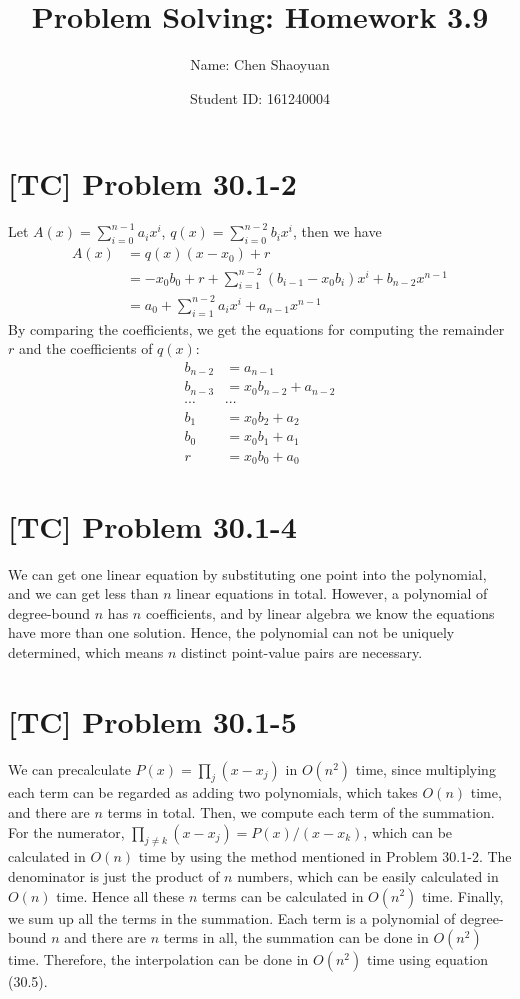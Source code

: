 \documentclass[a4paper,11pt,twocolumn]{article}
\newcommand{\homeworkno}{3.9}
\begin{document}
  \title{Problem Solving: Homework \homeworkno}
  \author{Name: Chen Shaoyuan \and Student ID: 161240004}
  \maketitle

  \section{[TC] Problem 30.1-2}
  Let $A(x) = \sum_{i=0}^{n-1} a_ix^i$, $q(x) = \sum_{i=0}^{n-2} b_ix^i$, then we have
  \begin{align*}
    A(x) &= q(x)(x - x_0) + r \\
         &= -x_0b_{0} + r + \sum_{i = 1}^{n-2}(b_{i-1}-x_0b_{i})x^i + b_{n-2}x^{n-1} \\
         &= a_0 + \sum_{i = 1}^{n-2}a_ix^i + a_{n-1}x^{n-1}
  \end{align*}
  By comparing the coefficients, we get the equations for computing the remainder $r$ and the coefficients of $q(x)$:
  \begin{align*}
    b_{n-2} &= a_{n-1} \\
    b_{n-3} &= x_0b_{n-2} + a_{n-2} \\
    \cdots & \cdots \\
    b_{1} &= x_0b_2 + a_2 \\
    b_{0} &= x_0b_1 + a_1 \\
    r &= x_0b_0 + a_0
  \end{align*}

  \section{[TC] Problem 30.1-4}
  We can get one linear equation by substituting one point into the polynomial, and we can get less than $n$ linear equations in total. However, a polynomial of degree-bound $n$ has $n$ coefficients, and by linear algebra we know the equations have more than one solution. Hence, the polynomial can not be uniquely determined, which means $n$ distinct point-value pairs are necessary.

  \section{[TC] Problem 30.1-5}
  We can precalculate $P(x) = \prod_j (x-x_j)$ in $O(n^2)$ time, since multiplying each term can be regarded as adding two polynomials, which takes $O(n)$ time, and there are $n$ terms in total. Then, we compute each term of the summation. For the numerator, $\prod_{j \neq k} (x - x_j) = P(x) / (x - x_k)$, which can be calculated in $O(n)$ time by using the method mentioned in Problem 30.1-2. The denominator is just the product of $n$ numbers, which can be easily calculated in $O(n)$ time. Hence all these $n$ terms can be calculated in $O(n^2)$ time. Finally, we sum up all the terms in the summation. Each term is a polynomial of degree-bound $n$ and there are $n$ terms in all, the summation can be done in $O(n^2)$ time. Therefore, the interpolation can be done in $O(n^2)$ time using equation (30.5).
\end{document}
